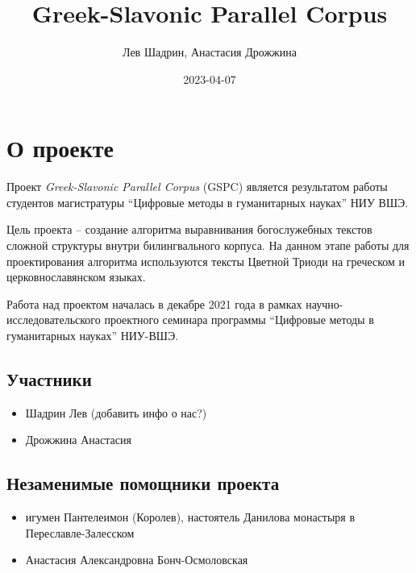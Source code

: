 \documentclass[
  letterpaper,
]{book}
\title{Greek-Slavonic Parallel Corpus}
\author{Лев Шадрин, Анастасия Дрожжина}
\date{2023-04-07}
\renewcommand*\contentsname{Содержание}
\newcommand\contentsname{Содержание}
\begin{document}
\frontmatter
\maketitle
\ifdefined\Shaded\renewenvironment{Shaded}{\begin{tcolorbox}[sharp corners, boxrule=0pt, interior hidden, enhanced, breakable, frame hidden, borderline west={3pt}{0pt}{shadecolor}]}{\end{tcolorbox}}\fi

\renewcommand*\contentsname{Содержание}
{
\setcounter{tocdepth}{2}
\tableofcontents
}
\mainmatter
{}

\hypertarget{sec-about_project}{%
\chapter{О проекте}\label{sec-about_project}}

Проект \emph{Greek-Slavonic Parallel Corpus} (GSPC) является результатом
работы студентов магистратуры ``Цифровые методы в гуманитарных науках''
НИУ ВШЭ.

Цель проекта -- создание алгоритма выравнивания богослужебных текстов
сложной структуры внутри билингвального корпуса. На данном этапе работы
для проектирования алгоритма используются тексты Цветной Триоди на
греческом и церковнославянском языках.

Работа над проектом началась в декабре 2021 года в рамках
научно-исследовательского проектного семинара программы ``Цифровые
методы в гуманитарных науках'' НИУ-ВШЭ.

\hypertarget{sec-authors}{%
\section{Участники}\label{sec-authors}}

\begin{itemize}
\item
  Шадрин Лев (добавить инфо о нас?)
\item
  Дрожжина Анастасия
\end{itemize}

\hypertarget{sec-acknowledgements}{%
\section{Незаменимые помощники проекта}\label{sec-acknowledgements}}

\begin{itemize}
\item
  игумен Пантелеимон (Королев), настоятель Данилова монастыря в
  Переславле-Залесском
\item
  Анастасия Александровна Бонч-Осмоловская
\end{itemize}
\end{document}

